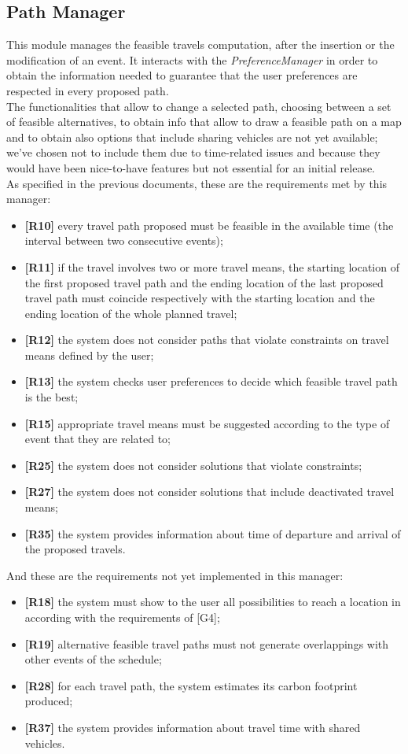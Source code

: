 \subsection{Path Manager}
This module manages the feasible travels computation, after the insertion or the modification of an event. It interacts with the \textit{PreferenceManager} in order to obtain the information needed to guarantee that the user preferences are respected in every proposed path.\\
The functionalities that allow to change a selected path, choosing between a set of feasible alternatives, to obtain info that allow to draw a feasible path on a map and to obtain also options that include sharing vehicles are not yet available; we've chosen not to include them due to time-related issues and because they would have been nice-to-have features but not essential for an initial release. \\
As specified in the previous documents, these are the requirements met by this manager:
\begin{itemize}
	\item \textbf{[R10]} every travel path proposed must be feasible in the available time (the interval between two consecutive events);
	\item \textbf{[R11]} if the travel involves two or more travel means, the starting location of the first proposed travel path and the ending location of the last proposed travel path must coincide respectively with the starting location and the ending location of the whole planned travel;
	\item \textbf{[R12]} the system does not consider paths that violate constraints on travel means defined by the user;
	\item \textbf{[R13]} the system checks user preferences to decide which feasible travel path is the best;
	\item \textbf{[R15]} appropriate travel means must be suggested according to the type of event that they are related to;
	\item \textbf{[R25]} the system does not consider solutions that violate constraints;
	\item \textbf{[R27]} the system does not consider solutions that include deactivated travel means;
	\item \textbf{[R35]} the system provides information about time of departure and arrival of the proposed travels.
\end{itemize}
And these are the requirements not yet implemented in this manager:
\begin{itemize}
	\item \textbf{[R18]} the system must show to the user all possibilities to reach a location in according with the requirements of [G4];
	\item \textbf{[R19]} alternative feasible travel paths must not generate overlappings with other events of the schedule;
	\item \textbf{[R28]} for each travel path, the system estimates its carbon footprint produced;
	\item \textbf{[R37]} the system provides information about travel time with shared vehicles.
\end{itemize}

